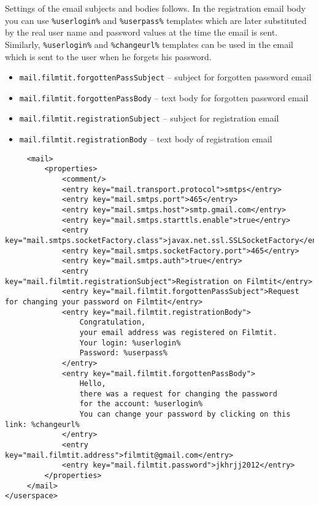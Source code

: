 Settings of the email subjects and bodies follows. In the registration email body you can use {\tt \%userlogin\%} and {\tt \%userpass\%} templates which are later substituted by the real user name and password values at the time the email is sent. Similarly, {\tt \%userlogin\%} and {\tt \%changeurl\%} templates can be used in the email which is sent to the user when he forgets his password.

\begin{itemize}
\item \verb#mail.filmtit.forgottenPassSubject# -- subject for forgotten password email
\item \verb#mail.filmtit.forgottenPassBody# -- text body for forgotten password email
\item \verb#mail.filmtit.registrationSubject# -- subject for registration email
\item \verb#mail.filmtit.registrationBody# -- text body of registration email
\end{itemize}

\begin{lstlisting}
     <mail>
         <properties>
             <comment/>
             <entry key="mail.transport.protocol">smtps</entry>
             <entry key="mail.smtps.port">465</entry>
             <entry key="mail.smtps.host">smtp.gmail.com</entry>
             <entry key="mail.smtps.starttls.enable">true</entry>
             <entry key="mail.smtps.socketFactory.class">javax.net.ssl.SSLSocketFactory</entry>
             <entry key="mail.smtps.socketFactory.port">465</entry>
             <entry key="mail.smtps.auth">true</entry>
             <entry key="mail.filmtit.registrationSubject">Registration on Filmtit</entry>
             <entry key="mail.filmtit.forgottenPassSubject">Request for changing your password on Filmtit</entry>
             <entry key="mail.filmtit.registrationBody">
                 Congratulation,
                 your email address was registered on Filmtit.
                 Your login: %userlogin%
                 Password: %userpass%
             </entry>
             <entry key="mail.filmtit.forgottenPassBody">
                 Hello,
                 there was a request for changing the password
                 for the account: %userlogin%
                 You can change your password by clicking on this link: %changeurl%
             </entry>
             <entry key="mail.filmtit.address">filmtit@gmail.com</entry>
             <entry key="mail.filmtit.password">jkhrjj2012</entry>
         </properties>
     </mail>
</userspace>
\end{lstlisting}



